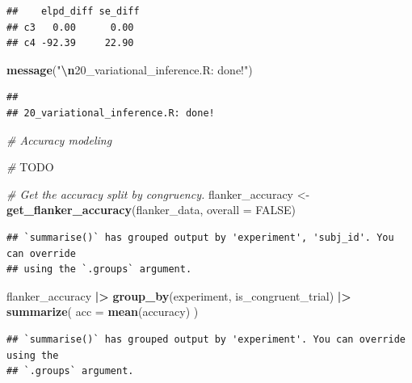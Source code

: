 \documentclass[
]{article}
\newenvironment{Shaded}{\begin{snugshade}}{\end{snugshade}}
\newcommand{\AlertTok}[1]{\textcolor[rgb]{0.94,0.16,0.16}{#1}}
\newcommand{\AttributeTok}[1]{\textcolor[rgb]{0.13,0.29,0.53}{#1}}
\newcommand{\CommentTok}[1]{\textcolor[rgb]{0.56,0.35,0.01}{\textit{#1}}}
\newcommand{\ConstantTok}[1]{\textcolor[rgb]{0.56,0.35,0.01}{#1}}
\newcommand{\FunctionTok}[1]{\textcolor[rgb]{0.13,0.29,0.53}{\textbf{#1}}}
\newcommand{\NormalTok}[1]{#1}
\newcommand{\OtherTok}[1]{\textcolor[rgb]{0.56,0.35,0.01}{#1}}
\newcommand{\SpecialCharTok}[1]{\textcolor[rgb]{0.81,0.36,0.00}{\textbf{#1}}}
\newcommand{\StringTok}[1]{\textcolor[rgb]{0.31,0.60,0.02}{#1}}
\begin{document}
\begin{verbatim}
##    elpd_diff se_diff
## c3   0.00      0.00 
## c4 -92.39     22.90
\end{verbatim}

\begin{Shaded}
\begin{Highlighting}[]
\FunctionTok{message}\NormalTok{(}\StringTok{"}\SpecialCharTok{\textbackslash{}n}\StringTok{20\_variational\_inference.R: done!"}\NormalTok{)}
\end{Highlighting}
\end{Shaded}

\begin{verbatim}
## 
## 20_variational_inference.R: done!
\end{verbatim}

\begin{Shaded}
\begin{Highlighting}[]
\CommentTok{\# Accuracy modeling}
\end{Highlighting}
\end{Shaded}

\begin{Shaded}
\begin{Highlighting}[]
\CommentTok{\# }\AlertTok{TODO}

\CommentTok{\# Get the accuracy split by congruency.}
\NormalTok{flanker\_accuracy }\OtherTok{\textless{}{-}} \FunctionTok{get\_flanker\_accuracy}\NormalTok{(flanker\_data, }\AttributeTok{overall =} \ConstantTok{FALSE}\NormalTok{)}
\end{Highlighting}
\end{Shaded}

\begin{verbatim}
## `summarise()` has grouped output by 'experiment', 'subj_id'. You can override
## using the `.groups` argument.
\end{verbatim}

\begin{Shaded}
\begin{Highlighting}[]
\NormalTok{flanker\_accuracy }\SpecialCharTok{|\textgreater{}} 
  \FunctionTok{group\_by}\NormalTok{(experiment, is\_congruent\_trial) }\SpecialCharTok{|\textgreater{}} 
  \FunctionTok{summarize}\NormalTok{(}
    \AttributeTok{acc =} \FunctionTok{mean}\NormalTok{(accuracy)}
\NormalTok{  )}
\end{Highlighting}
\end{Shaded}

\begin{verbatim}
## `summarise()` has grouped output by 'experiment'. You can override using the
## `.groups` argument.
\end{verbatim}
\end{document}
